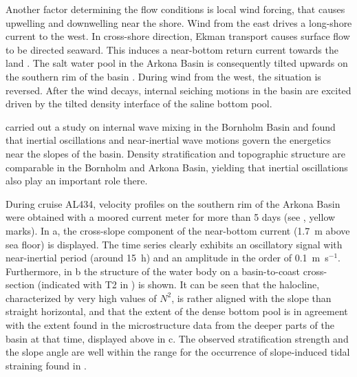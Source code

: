 Another factor determining the flow conditions is local wind forcing, 
that causes upwelling and downwelling near the shore. Wind from the east 
drives a long-shore current to the west. In cross-shore direction, Ekman 
transport causes surface flow to be directed seaward. This induces a 
near-bottom return current towards the land \citep[][]{lass1993}. The salt 
water pool in the Arkona Basin is consequently tilted upwards on the 
southern rim of the basin \citep[][their Fig.\ 11]{lass2003, lass1993}. During 
wind from the west, the situation is reversed. After the wind decays, 
internal seiching motions in the basin are excited driven by the tilted 
density interface of the saline bottom pool.

\cite{vanderlee2011} carried out a study on internal wave mixing in the 
Bornholm Basin and found that inertial oscillations and near-inertial wave 
motions govern the energetics near the slopes of the basin. Density 
stratification and topographic structure are comparable in the Bornholm and 
Arkona Basin, yielding that inertial oscillations also play an important role 
there.

 During cruise AL434, velocity profiles on the southern rim of the Arkona Basin 
were obtained with a moored current meter for more than 5 days (see 
, yellow marks). In a, the cross-slope component of 
the near-bottom current (1.7~m above sea floor) is displayed. The time series 
clearly exhibits an oscillatory signal with near-inertial period (around 15~h) 
and an amplitude in the order of 0.1~m~s$^{-1}$. Furthermore, 
in b the structure of the water body on a basin-to-coast 
cross-section (indicated with T2 in ) is shown. It can be seen 
that the halocline, characterized by very high values of $N^2$, is rather 
aligned with the slope than straight horizontal, and that the extent of the 
dense bottom pool is in agreement with the extent found in the microstructure 
data from the deeper parts of the basin at that time, displayed above in 
c. The observed stratification strength and the slope angle are 
well within the range for the occurrence of slope-induced tidal straining found 
in \cite{schulzumlauf2016}. 

